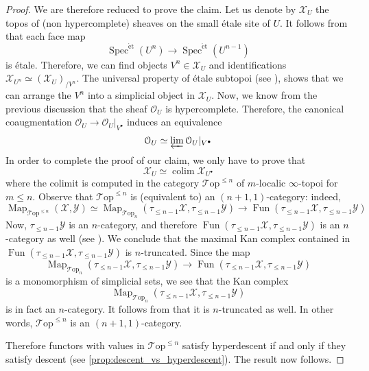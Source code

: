 \documentclass[12pt,a4paper,reqno]{amsart}
\theoremstyle{plain}
\theoremstyle{definition}
\theoremstyle{remark}
\numberwithin{equation}{section}
\begin{document}
\begin{proof}
	We are therefore reduced to prove the claim. Let us denote by ${\mathcal X}_U$ the topos of (non hypercomplete) sheaves on the small \'etale site of $U$.
	It follows from \cite[Example 2.3.8]{DAG-V} that each face map
	\[ \operatorname{Spec}^{\mathrm{\acute{e}t}}(U^n) \to \operatorname{Spec}^{\mathrm{\acute{e}t}}(U^{n-1}) \]
	is \'etale.
	Therefore, we can find objects $V^n \in {\mathcal X}_U$ and identifications ${\mathcal X}_{U^n} \simeq ({\mathcal X}_U)_{/V^n}$.
	The universal property of \'etale subtopoi (see \cite[6.3.5.6]{HTT}), shows that we can arrange the $V^n$ into a simplicial object in ${\mathcal X}_U$.
	Now, we know from the previous discussion that the sheaf ${\mathcal O}_U$ is hypercomplete. Therefore, the canonical coaugmentation ${\mathcal O}_U \to {\mathcal O}_U |_{V^\bullet}$ induces an equivalence
	\[ {\mathcal O}_U \simeq \varprojlim {\mathcal O}_U |_{V^\bullet} \]
	In order to complete the proof of our claim, we only have to prove that
	\[ {\mathcal X}_U \simeq \operatorname*{colim} {\mathcal X}_{U^\bullet} \]
	where the colimit is computed in the category ${\mathcal T\mathrm{op}}^{\le n}$ of $m$-localic $\infty$-topoi for $m \le n$.
	Observe that ${\mathcal T\mathrm{op}}^{\le n}$ is (equivalent to) an $(n+1,1)$-category: indeed,
	\[ \operatorname{Map}_{{\mathcal T\mathrm{op}}^{\le n}}({\mathcal X}, {\mathcal Y}) \simeq \operatorname{Map}_{{\mathcal T\mathrm{op}}_n}(\tau_{\le n-1} {\mathcal X}, \tau_{\le n - 1} {\mathcal Y}) \to \operatorname{Fun}(\tau_{\le n - 1} {\mathcal X}, \tau_{\le n - 1} {\mathcal Y}) \]
	Now, $\tau_{\le n - 1} {\mathcal Y}$ is an $n$-category, and therefore $\operatorname{Fun}(\tau_{\le n - 1} {\mathcal X}, \tau_{\le n - 1} {\mathcal Y})$ is an $n$-category as well (see \cite[2.3.4.8]{HTT}). We conclude that the maximal Kan complex contained in $\operatorname{Fun}(\tau_{\le n - 1} {\mathcal X}, \tau_{\le n - 1} {\mathcal Y})$ is $n$-truncated.
	Since the map
	\[ \operatorname{Map}_{{\mathcal T\mathrm{op}}_n}(\tau_{\le n-1} {\mathcal X}, \tau_{\le n - 1} {\mathcal Y}) \to \operatorname{Fun}(\tau_{\le n - 1} {\mathcal X}, \tau_{\le n - 1} {\mathcal Y}) \]
	is a monomorphism of simplicial sets, we see that the Kan complex
	\[ \operatorname{Map}_{{\mathcal T\mathrm{op}}_n}(\tau_{\le n-1} {\mathcal X}, \tau_{\le n - 1} {\mathcal Y}) \]
	is in fact an $n$-category.
	It follows from \cite[2.3.4.19]{HTT} that it is $n$-truncated as well. In other words, ${\mathcal T\mathrm{op}}^{\le n}$ is an $(n+1, 1)$-category.
	{\ignorespaces}
	
	Therefore functors with values in ${\mathcal T\mathrm{op}}^{\le n}$ satisfy hyperdescent if and only if they satisfy descent (see \cref{prop:descent_vs_hyperdescent}).
	The result now follows.
\end{proof}
\end{document}
